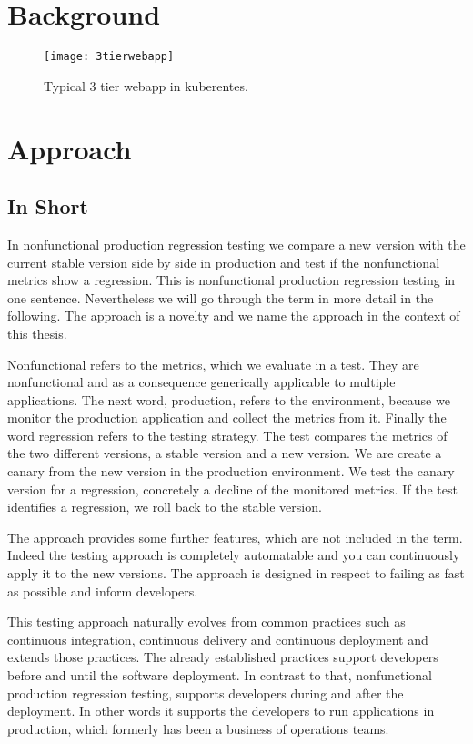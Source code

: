 \chapter{Background}

\begin{figure}[htbp]
  \centering
  \texttt{[image: 3tierwebapp]}
  \caption[3tierwebapp]{Typical 3 tier webapp in kuberentes.}
  \label{fig:3tierwebapp}
\end{figure}


\chapter{Approach}

\section{In Short}

In nonfunctional production regression testing we compare a new version with the current
stable version side by side in production and test if the nonfunctional metrics show a
regression. This is nonfunctional production regression testing in one sentence.
Nevertheless we will go through the term in more detail in the following. The approach is
a novelty and we name the approach in the context of this thesis.

Nonfunctional refers to the metrics, which we evaluate in a test. They are nonfunctional
and as a consequence generically applicable to multiple applications. The next word,
production, refers to the environment, because we monitor the production application and
collect the metrics from it. Finally the word regression refers to the testing
strategy. The test compares the metrics of the two different versions, a stable version
and a new version. We are create a canary from the new version in the production
environment. We test the canary version for a regression, concretely a decline of the
monitored metrics. If the test identifies a regression, we roll back to the stable
version.

The approach provides some further features, which are not included in the term. Indeed
the testing approach is completely automatable and you can continuously apply it to the
new versions. The approach is designed in respect to failing as fast as possible and
inform developers.

This testing approach naturally evolves from common practices such as continuous
integration, continuous delivery and continuous deployment and extends those
practices. The already established practices support developers before and until the
software deployment. In contrast to that, nonfunctional production regression testing,
supports developers during and after the deployment. In other words it supports the
developers to run applications in production, which formerly has been a business of
operations teams.

